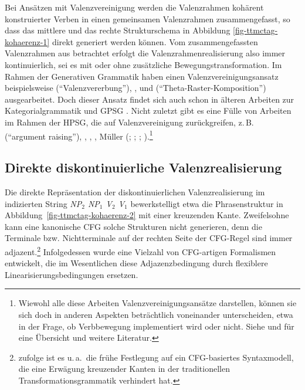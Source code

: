 Bei Ansätzen mit Valenzvereinigung werden die Valenzrahmen kohärent konstruierter Verben in einen gemeinsamen Valenzrahmen zusammengefasst, so dass das mittlere und das rechte Strukturschema in Abbildung \ref{fig-ttmctag-kohaerenz-1} direkt generiert werden können. Vom zusammengefassten Valenzrahmen aus betrachtet erfolgt die Valenzrahmenrealisierung also immer kontinuierlich, sei es mit oder ohne zusätzliche Bewegungstransformation. Im Rahmen der Generativen Grammatik haben einen Valenzvereinigungsansatz beispielsweise \cite{Jacobs:92} ("`Valenzvererbung"'), \citet[Abschnitt~9.6.2.2]{Haider:93}, \cite{Wurmbrand:01} und \citet[Kapitel~5]{Sternefeld:06} ("`Theta-Raster-Komposition"') ausgearbeitet. Doch dieser Ansatz findet sich auch schon in älteren Arbeiten zur Kategorialgrammatik \citep{Geach:70,Steedman:85} und GPSG \citep{Johnson:86}. Nicht zuletzt gibt es eine Fülle von Arbeiten im Rahmen der HPSG, die auf Valenzvereinigung zurückgreifen, z.\,B.\ \cite{Hinrichs:Nakazawa:89,Hinrichs:Nakazawa:94} ("`argument raising"'), \cite{Nerbonne:94}, \cite{Pollard:96}, \cite{Meurers:99}, Müller (\citeyear[Kapitel~17--18]{Mueller:99}; \citeyear[Chapter~2]{Mueller:02}; \citeyear{Mueller:05}; \citeyear{Mueller:09}).\footnote{Wiewohl alle diese Arbeiten Valenzvereinigungsansätze darstellen, können sie sich doch in anderen Aspekten beträchtlich voneinander unterscheiden, etwa in der Frage, ob Verbbewegung implementiert wird oder nicht. Siehe \cite{Meurers:99b} und \cite{Mueller:05} für eine Übersicht und weitere Literatur.}


\subsection{Direkte diskontinuierliche Valenzrealisierung} \label{sec-kohaerenz-strategien-direkt}

Die direkte Repräsentation der diskontinuierlichen Valenzrealisierung im indizierten String {\it NP$_2$ NP$_1$ V$_2$ V$_1$} bewerkstelligt etwa die Phrasenstruktur in Abbildung~\ref{fig-ttmctag-kohaerenz-2} mit einer kreuzenden Kante. Zweifelsohne kann eine kanonische CFG solche Strukturen nicht generieren, denn die Terminale bzw. Nichtterminale auf der rechten Seite der CFG-Regel sind immer adjazent.\footnote{\cite{McCawley:82} zufolge ist es u.\,a.\ die frühe Festlegung auf ein CFG-basiertes Syntaxmodell, die eine Erwägung kreuzender Kanten in der traditionellen Transformationsgrammatik verhindert hat.} Infolgedessen wurde eine Vielzahl von CFG-artigen Formalismen entwickelt, die im Wesentlichen diese Adjazenzbedingung durch flexiblere Linearisierungsbedingungen ersetzen.    

